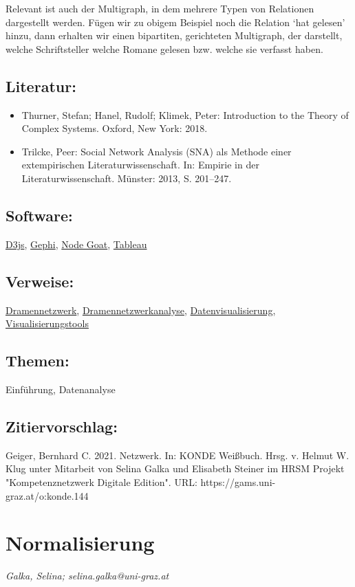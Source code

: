 \documentclass{article}
\begin{document}
        Relevant ist auch der Multigraph, in dem mehrere Typen von Relationen dargestellt werden. Fügen wir zu obigem Beispiel noch die Relation ‘hat gelesen’ hinzu, dann erhalten wir einen bipartiten, gerichteten Multigraph, der darstellt, welche Schriftsteller welche Romane gelesen bzw. welche sie verfasst haben.\\
            
        \subsection*{Literatur:}\begin{itemize}\item Thurner, Stefan; Hanel, Rudolf; Klimek, Peter: Introduction to the Theory of Complex Systems. Oxford, New York: 2018.\item Trilcke, Peer: Social Network Analysis (SNA) als  Methode einer  extempirischen Literaturwissenschaft. In: Empirie in der Literaturwissenschaft. Münster: 2013, S. 201–247.\end{itemize}\subsection*{Software:}\href{https://d3js.org}{D3js}, \href{https://gephi.org/}{Gephi}, \href{https://nodegoat.net/}{Node Goat}, \href{https://public.tableau.com/s/}{Tableau}\subsection*{Verweise:}\href{https://gams.uni-graz.at/o:konde.73}{Dramennetzwerk}, \href{https://gams.uni-graz.at/o:konde.74}{Dramennetzwerkanalyse}, \href{https://gams.uni-graz.at/o:konde.54}{Datenvisualisierung}, \href{https://gams.uni-graz.at/o:konde.210}{Visualisierungstools}\subsection*{Themen:}Einführung, Datenanalyse\subsection*{Zitiervorschlag:}Geiger, Bernhard C. 2021. Netzwerk. In: KONDE Weißbuch. Hrsg. v. Helmut W. Klug unter Mitarbeit von Selina Galka und Elisabeth Steiner im HRSM Projekt "Kompetenznetzwerk Digitale Edition". URL: https://gams.uni-graz.at/o:konde.144\newpage\section*{Normalisierung} \emph{Galka, Selina; selina.galka@uni-graz.at }\\
        
\end{document}
